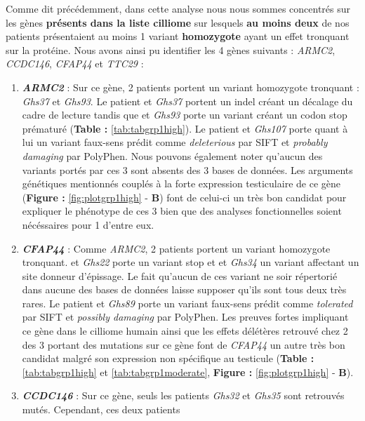 \documentclass[12pt,twoside]{reedthesis}
\theoremstyle{definition}
\theoremstyle{definition}
\theoremstyle{remark}
\begin{document}
  Comme dit précédemment, dans cette analyse nous nous sommes concentrés
  sur les gènes \textbf{présents dans la liste cilliome} sur lesquels
  \textbf{au moins deux} de nos patients présentaient au moins 1 variant
  \textbf{homozygote} ayant un effet tronquant sur la protéine. Nous avons
  ainsi pu identifier les 4 gènes suivants : \emph{ARMC2}, \emph{CCDC146},
  \emph{CFAP44} et \emph{TTC29} :
  
  \begin{enumerate}
  \def\labelenumi{\arabic{enumi}.}
  \item
    \textbf{\emph{ARMC2}} : Sur ce gène, 2 patients portent un variant
    homozygote tronquant : \emph{Ghs37} et \emph{Ghs93}. Le patient et
    \emph{Ghs37} portent un indel créant un décalage du cadre de lecture
    tandis que et \emph{Ghs93} porte un variant créant un codon stop
    prématuré (\textbf{Table : }\ref{tab:tabgrp1high}). Le patient et
    \emph{Ghs107} porte quant à lui un variant faux-sens prédit comme
    \emph{deleterious} par SIFT et \emph{probably damaging} par PolyPhen.
    Nous pouvons également noter qu'aucun des variants portés par ces 3
    sont absents des 3 bases de données. Les arguments génétiques
    mentionnés couplés à la forte expression testiculaire de ce gène
    (\textbf{Figure : }\ref{fig:plotgrp1high} - \textbf{B}) font de
    celui-ci un très bon candidat pour expliquer le phénotype de ces 3
    bien que des analyses fonctionnelles soient nécéssaires pour 1 d'entre
    eux.
  \item
    \textbf{\emph{CFAP44}} : Comme \emph{ARMC2}, 2 patients portent un
    variant homozygote tronquant. et \emph{Ghs22} porte un variant stop et
    et \emph{Ghs34} un variant affectant un site donneur d'épissage. Le
    fait qu'aucun de ces variant ne soir répertorié dans aucune des bases
    de données laisse supposer qu'ils sont tous deux très rares. Le
    patient et \emph{Ghs89} porte un variant faux-sens prédit comme
    \emph{tolerated} par SIFT et \emph{possibly damaging} par PolyPhen.
    Les preuves fortes impliquant ce gène dans le cilliome humain ainsi
    que les effets délétères retrouvé chez 2 des 3 portant des mutations
    sur ce gène font de \emph{CFAP44} un autre très bon candidat malgré
    son expression non spécifique au testicule (\textbf{Table :
    }\ref{tab:tabgrp1high} et \ref{tab:tabgrp1moderate}, \textbf{Figure :
    }\ref{fig:plotgrp1high} - \textbf{B}).
  \item
    \textbf{\emph{CCDC146}} : Sur ce gène, seuls les patients \emph{Ghs32}
    et \emph{Ghs35} sont retrouvés mutés. Cependant, ces deux patients

\end{enumerate}
\end{document}
